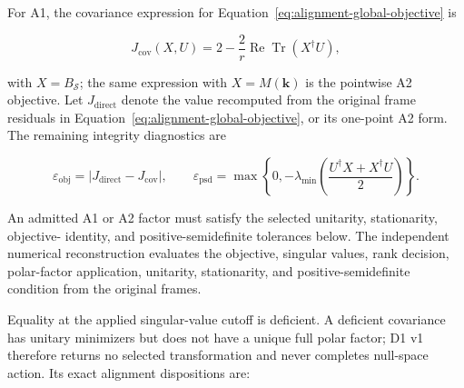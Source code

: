 \documentclass[11pt]{article}
\begin{document}
For A1, the covariance expression for Equation~\eqref{eq:alignment-global-objective}
is

\begin{equation}
 J_{\mathrm{cov}}(X,U)
 =2-\frac{2}{r}\operatorname{Re}\operatorname{Tr}(X^\dagger U),
 \label{eq:alignment-objective-covariance}
\end{equation}

with $X=B_{\mathcal S}$; the same expression with $X=M(\mathbf k)$ is the pointwise A2
objective. Let $J_{\mathrm{direct}}$ denote the value recomputed from the original frame
residuals in Equation~\eqref{eq:alignment-global-objective}, or its one-point A2 form.
The remaining integrity diagnostics are

\begin{equation}
 \varepsilon_{\mathrm{obj}}
 =\left|J_{\mathrm{direct}}-J_{\mathrm{cov}}\right|,
 \qquad
 \varepsilon_{\mathrm{psd}}
 =\max\!\left\{0,-\lambda_{\min}\!\left(
 \frac{U^\dagger X+X^\dagger U}{2}
 \right)\right\}.
 \label{eq:alignment-objective-psd-defects}
\end{equation}

An admitted A1 or A2 factor must satisfy the selected unitarity, stationarity, objective-
identity, and positive-semidefinite tolerances below. The independent numerical
reconstruction evaluates the objective, singular values, rank decision, polar-factor
application, unitarity, stationarity, and positive-semidefinite condition from the
original frames.

Equality at the applied singular-value cutoff is deficient. A deficient covariance has
unitary minimizers but does not have a unique full polar factor; D1 v1 therefore returns
no selected transformation and never completes null-space action. Its exact alignment
dispositions are:
\end{document}
